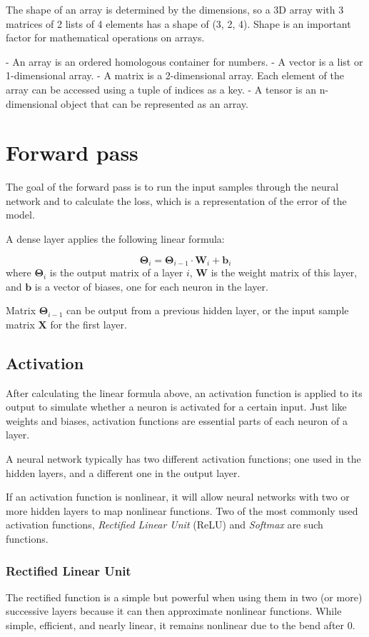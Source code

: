 \documentclass[a4paper]{report}
\newcommand{\matr}[1]{\mathbf{#1}}
\newcommand{\vect}[1]{\bm{#1}}
\begin{document}
The shape of an array is determined by the dimensions, so a 3D array with 3 matrices of 2 lists of 4 elements has a shape of (3, 2, 4). Shape is an important factor for mathematical operations on arrays.

- An array is an ordered homologous container for numbers.
- A vector is a list or 1-dimensional array.
- A matrix is a 2-dimensional array. Each element of the array can be accessed using a tuple of indices as a key.
- A tensor is an n-dimensional object that can be represented as an array. 

\section{Forward pass}
The goal of the forward pass is to run the input samples through the neural network and to calculate the loss, which is a representation of the error of the model.

A dense layer applies the following linear formula:

\begin{equation*}
    \matr{\Theta}_i = \matr{\Theta}_{i-1} \cdot \matr{W}_i + \bm{b}_i
\end{equation*}
where $\matr{\Theta}_i$ is the output matrix of a layer $i$, $\matr{W}$ is the weight matrix of this layer, and $\vect{b}$ is a vector of biases, one for each neuron in the layer.

Matrix $\matr{\Theta}_{i-1}$ can be output from a previous hidden layer, or the input sample matrix $\matr{X}$ for the first layer.

\subsection*{Activation}
After calculating the linear formula above, an activation function is applied to its output to simulate whether a neuron is activated for a certain input. Just like weights and biases, activation functions are essential parts of each neuron of a layer.

A neural network typically has two different activation functions; one used in the hidden layers, and a different one in the output layer.

If an activation function is nonlinear, it will allow neural networks with two or more hidden layers to map nonlinear functions. Two of the most commonly used activation functions, \emph{Rectified Linear Unit} (ReLU) and \emph{Softmax} are such functions.

\subsubsection*{Rectified Linear Unit}
The rectified function is a simple but powerful when using them in two (or more) successive layers because it can then approximate nonlinear functions. While simple, efficient, and nearly linear, it remains nonlinear due to the bend after 0.
\end{document}
